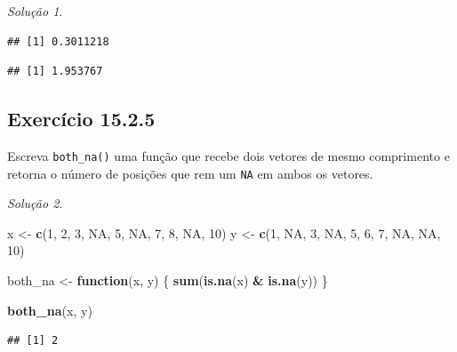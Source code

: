 \documentclass[
]{latex/krantz}
\newenvironment{Shaded}{\begin{snugshade}}{\end{snugshade}}
\newcommand{\ConstantTok}[1]{\textcolor[rgb]{0.56,0.35,0.01}{#1}}
\newcommand{\ControlFlowTok}[1]{\textcolor[rgb]{0.13,0.29,0.53}{\textbf{#1}}}
\newcommand{\DecValTok}[1]{\textcolor[rgb]{0.00,0.00,0.81}{#1}}
\newcommand{\FunctionTok}[1]{\textcolor[rgb]{0.13,0.29,0.53}{\textbf{#1}}}
\newcommand{\NormalTok}[1]{#1}
\newcommand{\OtherTok}[1]{\textcolor[rgb]{0.56,0.35,0.01}{#1}}
\newcommand{\SpecialCharTok}[1]{\textcolor[rgb]{0.81,0.36,0.00}{\textbf{#1}}}
\theoremstyle{definition}
\theoremstyle{definition}
\theoremstyle{definition}
\theoremstyle{definition}
\theoremstyle{remark}
\newtheorem*{solution}{Solução}
\begin{document}
\begin{solution}
\begin{verbatim}
## [1] 0.3011218
\end{verbatim}

\begin{Shaded}
\end{Shaded}

\begin{verbatim}
## [1] 1.953767
\end{verbatim}

\end{solution}

\hypertarget{exr15-2-5}{%
\subsection*{Exercício 15.2.5}\label{exr15-2-5}}

Escreva \texttt{both\_na()} uma função que recebe dois vetores de mesmo comprimento e retorna o número de posições que rem um \texttt{NA} em ambos os vetores.

\begin{solution}
\leavevmode

\begin{Shaded}
\begin{Highlighting}[]
\NormalTok{x }\OtherTok{\textless{}{-}} \FunctionTok{c}\NormalTok{(}\DecValTok{1}\NormalTok{, }\DecValTok{2}\NormalTok{,  }\DecValTok{3}\NormalTok{, }\ConstantTok{NA}\NormalTok{, }\DecValTok{5}\NormalTok{, }\ConstantTok{NA}\NormalTok{, }\DecValTok{7}\NormalTok{, }\DecValTok{8}\NormalTok{,  }\ConstantTok{NA}\NormalTok{, }\DecValTok{10}\NormalTok{)}
\NormalTok{y }\OtherTok{\textless{}{-}} \FunctionTok{c}\NormalTok{(}\DecValTok{1}\NormalTok{, }\ConstantTok{NA}\NormalTok{, }\DecValTok{3}\NormalTok{, }\ConstantTok{NA}\NormalTok{, }\DecValTok{5}\NormalTok{, }\DecValTok{6}\NormalTok{,  }\DecValTok{7}\NormalTok{, }\ConstantTok{NA}\NormalTok{, }\ConstantTok{NA}\NormalTok{, }\DecValTok{10}\NormalTok{)}

\NormalTok{both\_na }\OtherTok{\textless{}{-}} \ControlFlowTok{function}\NormalTok{(x, y) \{}
  \FunctionTok{sum}\NormalTok{(}\FunctionTok{is.na}\NormalTok{(x) }\SpecialCharTok{\&} \FunctionTok{is.na}\NormalTok{(y))}
\NormalTok{\}}

\FunctionTok{both\_na}\NormalTok{(x, y)}
\end{Highlighting}
\end{Shaded}

\begin{verbatim}
## [1] 2
\end{verbatim}

\end{solution}
\end{document}
